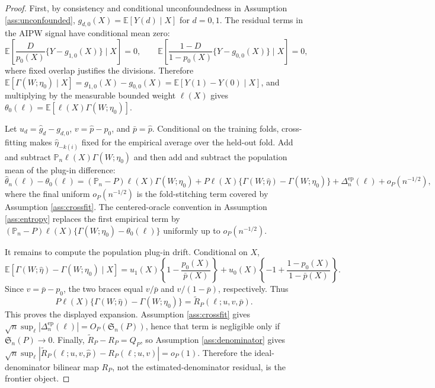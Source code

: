 \documentclass[11pt]{article}
\newcommand{\E}{\mathbb{E}}
\theoremstyle{definition}
\theoremstyle{plain}
\theoremstyle{remark}
\begin{document}
\begin{proof}
First, by consistency and conditional unconfoundedness in Assumption \ref{ass:unconfounded},
\(g_{d,0}(X)=\E[Y(d)\mid X]\) for \(d=0,1\).  The residual terms in the AIPW signal have conditional mean zero:
\[
\E\left[\frac{D}{p_0(X)}\{Y-g_{1,0}(X)\}\mid X\right]=0,
\qquad
\E\left[\frac{1-D}{1-p_0(X)}\{Y-g_{0,0}(X)\}\mid X\right]=0,
\]
where fixed overlap justifies the divisions.  Therefore
\(\E[\Gamma(W;\eta_0)\mid X]=g_{1,0}(X)-g_{0,0}(X)=\E[Y(1)-Y(0)\mid X]\), and multiplying by the measurable bounded weight \(\ell(X)\) gives
\(\theta_0(\ell)=\E[\ell(X)\Gamma(W;\eta_0)]\).

Let \(u_d=\hat g_d-g_{d,0}\), \(v=\hat p-p_0\), and \(\bar p=\hat p\).  Conditional on the training folds, cross-fitting makes \(\hat\eta_{-k(i)}\) fixed for the empirical average over the held-out fold.  Add and subtract \(\mathbb{P}_n\ell(X)\Gamma(W;\eta_0)\) and then add and subtract the population mean of the plug-in difference:
\[
\hat\theta_n(\ell)-\theta_0(\ell)
=(\mathbb{P}_n-P)\ell(X)\Gamma(W;\eta_0)
+P\ell(X)\{\Gamma(W;\hat\eta)-\Gamma(W;\eta_0)\}
+\Delta^{\mathrm{ep}}_n(\ell)+o_P(n^{-1/2}),
\]
where the final uniform \(o_P(n^{-1/2})\) is the fold-stitching term covered by Assumption \ref{ass:crossfit}.  The centered-oracle convention in Assumption \ref{ass:entropy} replaces the first empirical term by
\((\mathbb{P}_n-P)\ell(X)\{\Gamma(W;\eta_0)-\theta_0(\ell)\}\) uniformly up to \(o_P(n^{-1/2})\).

It remains to compute the population plug-in drift.  Conditional on \(X\),
\[
\E[\Gamma(W;\hat\eta)-\Gamma(W;\eta_0)\mid X]
=u_1(X)\left\{1-\frac{p_0(X)}{\bar p(X)}\right\}
+u_0(X)\left\{-1+\frac{1-p_0(X)}{1-\bar p(X)}\right\}.
\]
Since \(v=\bar p-p_0\), the two braces equal \(v/\bar p\) and \(v/(1-\bar p)\), respectively.  Thus
\[
P\ell(X)\{\Gamma(W;\hat\eta)-\Gamma(W;\eta_0)\}
=\widetilde R_P(\ell;u,v,\bar p).
\]
This proves the displayed expansion.  Assumption \ref{ass:crossfit} gives
\(\sqrt n\sup_\ell|\Delta^{\mathrm{ep}}_n(\ell)|=O_P(\mathfrak{S}_n(P))\), hence that term is negligible only if \(\mathfrak{S}_n(P)\to0\).  Finally,
\(\widetilde R_P-R_P=Q_P\), so Assumption \ref{ass:denominator} gives
\(\sqrt n\sup_\ell|\widetilde R_P(\ell;u,v,\hat p)-R_P(\ell;u,v)|=o_P(1)\).  Therefore the ideal-denominator bilinear map \(R_P\), not the estimated-denominator residual, is the frontier object.
\end{proof}
\end{document}
